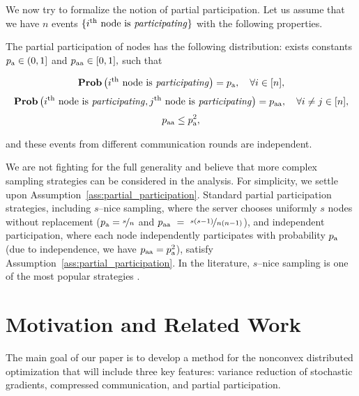 \documentclass{article}
\newcommand*{\probavailable}{\ensuremath{p_{\textnormal{a}}}}
\newcommand*{\probpairaa}{\ensuremath{p_{\textnormal{aa}}}}
\begin{document}
We now try to formalize the notion of partial participation. Let us assume that we have $n$ events $\{i^{\textnormal{th}} \textnormal{ node is \textit{participating}}\}$ with the following properties.
\begin{assumption}
  \label{ass:partial_participation}
  The partial participation of nodes has the following distribution: exists constants $\probavailable \in (0, 1]$ and $\probpairaa \in [0, 1],$ such that
  \begin{enumerate}
    \Item \begin{align*}\Prob\left(i^{\textnormal{th}} \textnormal{ node is \textit{participating}}\right) = \probavailable, \quad \forall i \in [n],\end{align*}
    \Item \begin{align*}\Prob\left(i^{\textnormal{th}} \textnormal{ node is \textit{participating}}, j^{\textnormal{th}} \textnormal{ node is \textit{participating}}\right) = \probpairaa, \quad \forall i \neq j \in [n],\end{align*}
    \Item \begin{align} \label{eq:partial_participation_constraint}
      \probpairaa \leq \probavailable^2,
    \end{align}
  \end{enumerate}
  and these events from different communication rounds are independent.
\end{assumption}

We are not fighting for the full generality and believe that more complex sampling strategies can be considered in the analysis. For simplicity, we settle upon Assumption~\ref{ass:partial_participation}. Standard partial participation strategies, including $s$--nice sampling, where the server chooses uniformly $s$ nodes without replacement ($\probavailable = \nicefrac{s}{n}$ and $\probpairaa~=~\nicefrac{s(s-1)}{n(n-1)}$),
and independent participation, where each node independently participates with probability $\probavailable$ (due to independence, we have $\probpairaa = \probavailable^2$), satisfy Assumption~\ref{ass:partial_participation}. In the literature, $s$--nice sampling is one of the most popular strategies \citep{zhao2021faster, fatkhullin2021ef21, reddi2020adaptive, konevcny2016federated}. 

\section{Motivation and Related Work}
The main goal of our paper is to develop a method for the nonconvex distributed optimization that will include three key features: variance reduction of stochastic gradients, compressed communication, and partial participation.
\end{document}
